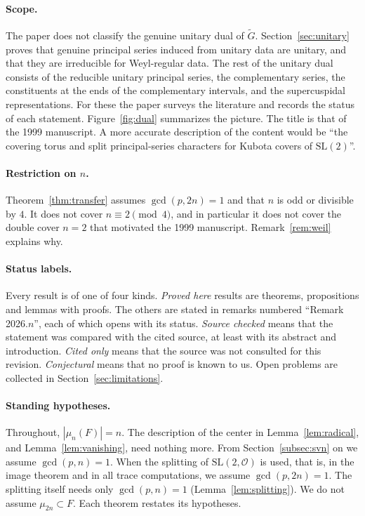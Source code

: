 \documentclass[12pt,letterpaper]{article}
\numberwithin{equation}{section}
\theoremstyle{plain}
\theoremstyle{definition}
\theoremstyle{remark}
\newcommand{\Gt}{\widetilde G}
\newcommand{\Of}{\mathcal O}
\newcommand{\SL}{\mathrm{SL}}
\begin{document}
\paragraph{Scope.} The paper does not classify the genuine unitary dual
of $\Gt$. Section~\ref{sec:unitary} proves that genuine principal series
induced from unitary data are unitary, and that they are irreducible
for Weyl-regular data. The rest of the unitary dual consists of the
reducible unitary principal series, the complementary series, the
constituents at the ends of the complementary intervals, and the
supercuspidal representations. For these the paper surveys the
literature and records the status of each statement.
Figure~\ref{fig:dual} summarizes the picture. The title is that of the
1999 manuscript. A more accurate description of the content would be
``the covering torus and split principal-series characters for Kubota
covers of $\SL(2)$''.

\paragraph{Restriction on $n$.} Theorem~\ref{thm:transfer} assumes
$\gcd(p,2n)=1$ and that $n$ is odd or divisible by $4$. It does not
cover $n\equiv2\pmod4$, and in particular it does not cover the double
cover $n=2$ that motivated the 1999 manuscript.
Remark~\ref{rem:weil} explains why.

\paragraph{Status labels.} Every result is of one of four kinds.
\emph{Proved here} results are theorems, propositions and lemmas with
proofs. The others are stated in remarks numbered ``Remark 2026.$n$'',
each of which opens with its status. \emph{Source checked} means that
the statement was compared with the cited source, at least with its
abstract and introduction. \emph{Cited only} means that the source was
not consulted for this revision. \emph{Conjectural} means that no proof
is known to us. Open problems are collected in
Section~\ref{sec:limitations}.

\paragraph{Standing hypotheses.} Throughout, $|\mu_n(F)|=n$. The
description of the center in Lemma~\ref{lem:radical}, and
Lemma~\ref{lem:vanishing}, need nothing more. From
Section~\ref{subsec:svn} on we assume $\gcd(p,n)=1$. When the splitting
of $\SL(2,\Of)$ is used, that is, in the image theorem and in all trace
computations, we assume $\gcd(p,2n)=1$. The splitting itself needs only $\gcd(p,n)=1$
(Lemma~\ref{lem:splitting}). We do not assume $\mu_{2n}\subset F$. Each
theorem restates its hypotheses.
\end{document}
